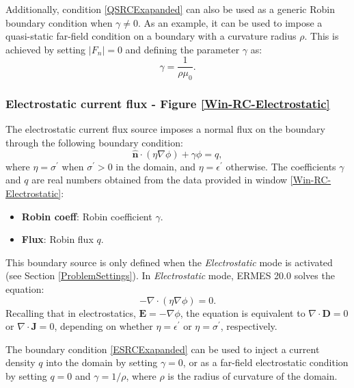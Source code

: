 Additionally, condition \eqref{QSRCExapanded} can also be used as a generic Robin boundary condition when $\gamma \neq 0$. As an example, it can be used to impose a quasi-static far-field condition on a boundary with a curvature radius $\rho$. This is achieved by setting $|F_{n}| = 0$ and defining the parameter $\gamma$ as: 
\begin{equation}
	\gamma = \frac{1}{\rho\mu_{0}}.	
\end{equation}

\subsubsection{Electrostatic current flux - Figure \ref{Win-RC-Electrostatic}}\label{bsRCElectroStatic}

The electrostatic current flux source imposes a normal flux on the boundary through the following boundary condition: 
\begin{equation}\label{ESRCExapanded}
	\mathbf{\hat{n}}\cdot\left(\eta\nabla\phi\right) + \gamma\phi = q,
\end{equation}
where $\eta = \sigma^{'}$ when $\sigma^{'} > 0$ in the domain, and $\eta = \epsilon^{'}$ otherwise. The coefficients $\gamma$ and $q$ are real numbers obtained from the data provided in window \ref{Win-RC-Electrostatic}:
\begin{itemize}\itemsep0em 
	\item \textbf{Robin coeff}: Robin coefficient $\gamma$.
	\item \textbf{Flux}: Robin flux $q$.
\end{itemize}
This boundary source is only defined when the \textit{Electrostatic} mode is activated (see Section \ref{ProblemSettings}). In \textit{Electrostatic} mode, ERMES 20.0 solves the equation:
\begin{equation}\label{Laplace}
	- \nabla\cdot\left(\eta\nabla\phi\right) = 0.
\end{equation}
Recalling that in electrostatics, $\mathbf{E} = -\nabla\phi$, the equation is equivalent to $\nabla\cdot\mathbf{D} = 0$ or $\nabla\cdot\mathbf{J} = 0$, depending on whether $\eta = \epsilon^{'}$ or $\eta = \sigma^{'}$, respectively.

The boundary condition \eqref{ESRCExapanded} can be used to inject a current density $q$ into  the domain by setting $\gamma = 0$, or as a far-field electrostatic condition by setting $q = 0$ and $\gamma = 1/\rho$, where 
$\rho$ is the radius of curvature of the domain.
\quad\\

